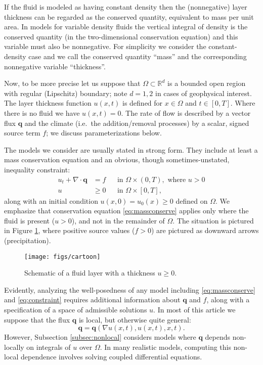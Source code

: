 \documentclass[final,onefignum]{siamart190516}
\newcommand\bq{\mathbf{q}}
\newcommand{\Div}{\nabla\cdot}
\newcommand{\grad}{\nabla}
\newcommand\RR{\mathbb{R}}
\begin{document}
If the fluid is modeled as having constant density then the (nonnegative) layer thickness can be regarded as the conserved quantity, equivalent to mass per unit area.  In models for variable density fluids the vertical integral of density is the conserved quantity (in the two-dimensional conservation equation) and this variable must also be nonnegative.  For simplicity we consider the constant-density case and we call the conserved quantity ``mass'' and the corresponding nonnegative variable ``thickness''.

Now, to be more precise let us suppose that $\Omega \subset \RR^d$ is a bounded open region with regular (Lipschitz) boundary; note $d=1,2$ in cases of geophysical interest.  The layer thickness function $u(x,t)$ is defined for $x\in \Omega$ and $t \in [0,T]$.  Where there is no fluid we have $u(x,t)=0$.  The rate of flow is described by a vector flux $\bq$ and the climate (i.e.~the addition/removal processes) by a scalar, signed source term $f$; we discuss parameterizations below.

The models we consider are usually stated in strong form.  They include at least a mass conservation equation and an obvious, though sometimes-unstated, inequality constraint:
\begin{align}
u_t + \Div \bq &= f &&\text{in } \Omega \times (0,T), \text{ where } u > 0 \label{eq:massconserve} \\
u &\ge 0 &&\text{in } \Omega \times [0,T], \label{eq:constraint}
\end{align}
along with an initial condition $u(x,0)=u_0(x)\ge 0$ defined on $\Omega$.  We emphasize that conservation equation \eqref{eq:massconserve} applies only where the fluid is present ($u>0$), and not in the remainder of $\Omega$.  The situation is pictured in Figure \ref{fig:cartoon}, where positive source values ($f>0$) are pictured as downward arrows (precipitation).

\begin{figure}[ht]
\centerline{\texttt{[image: figs/cartoon]}}
\caption{Schematic of a fluid layer with a thickness $u\ge 0$.}
\label{fig:cartoon}
\end{figure}

Evidently, analyzing the well-posedness of any model including \eqref{eq:massconserve} and \eqref{eq:constraint} requires additional information about $\bq$ and $f$, along with a specification of a space of admissible solutions $u$.  In most of this article we suppose that the flux $\bq$ is local, but otherwise quite general:
\begin{equation}
\bq = \bq(\grad u(x,t),u(x,t),x,t). \label{eq:fluxdepends}
\end{equation}
However, Subsection \ref{subsec:nonlocal} considers models where $\bq$ depends non-locally on integrals of $u$ over $\Omega$.  In many realistic models, computing this non-local dependence involves solving coupled differential equations.
\end{document}
